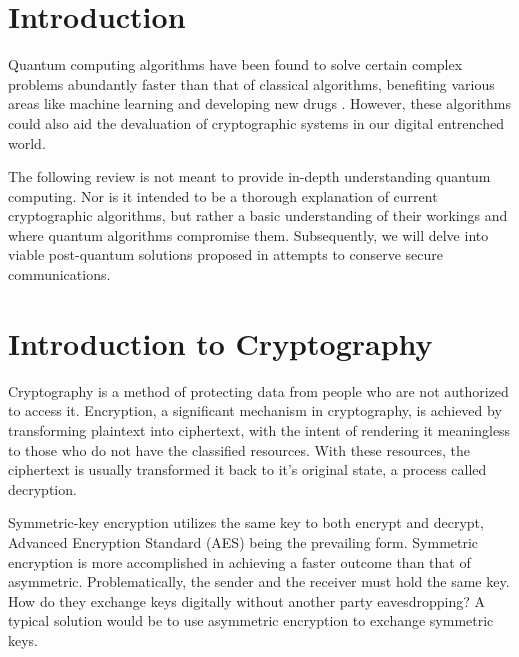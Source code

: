 \section{Introduction}
Quantum computing algorithms have been found to solve certain complex problems abundantly faster than that of classical algorithms, benefiting various areas like machine learning \cite{Sec_Risk} and developing new drugs \cite{Q_Comp_Real}. 
However, these algorithms could also aid the devaluation of cryptographic systems in our digital entrenched world.



The following review is not meant to provide in-depth understanding quantum computing. Nor is it intended to be a thorough explanation of current cryptographic algorithms, but rather a basic understanding of their workings and where quantum algorithms compromise them.
Subsequently, we will delve into viable post-quantum solutions proposed in attempts to conserve secure communications.

\section{Introduction to Cryptography}
Cryptography is a method of protecting data from people who are not authorized to access it. Encryption, a significant mechanism in cryptography, is achieved by transforming plaintext into ciphertext, with the intent of rendering it meaningless to those who do not have the classified resources. With these resources, the ciphertext is usually transformed it back to it's original state, a process called decryption.

Symmetric-key encryption utilizes the same key to both encrypt and decrypt, Advanced Encryption Standard (AES) being the prevailing form. Symmetric encryption is more accomplished in achieving a faster outcome than that of asymmetric. Problematically, the sender and the receiver must hold the same key. How do they exchange keys digitally without another party eavesdropping? A typical solution would be to use asymmetric encryption to exchange symmetric keys.

